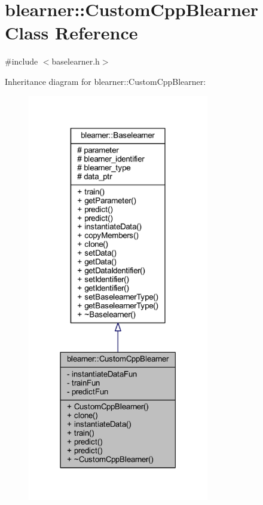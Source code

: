 \hypertarget{classblearner_1_1_custom_cpp_blearner}{}\section{blearner\+:\+:Custom\+Cpp\+Blearner Class Reference}
\label{classblearner_1_1_custom_cpp_blearner}


{\ttfamily \#include $<$baselearner.\+h$>$}



Inheritance diagram for blearner\+:\+:Custom\+Cpp\+Blearner\+:\nopagebreak
\begin{figure}[H]
\begin{center}
\leavevmode
\includegraphics[width=224pt]{classblearner_1_1_custom_cpp_blearner__inherit__graph}
\end{center}
\end{figure}


